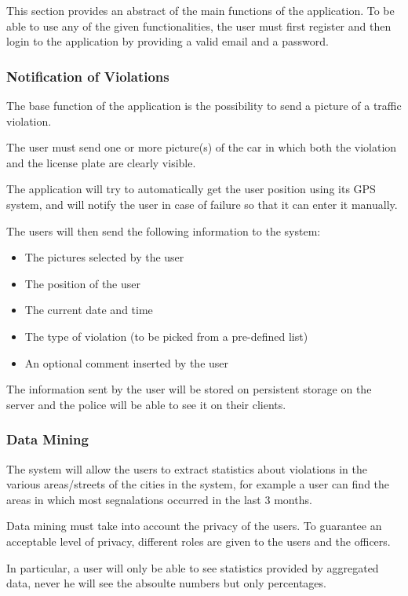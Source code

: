 This section provides an abstract of the main functions of the application. To be able to use any of the given functionalities, the user must first register and then login to the application by providing a valid email and a password.
\subsubsection{Notification of Violations}
\label{sec:notification_of_violations}
The base function of the application is the possibility to send a picture of a traffic violation.

The user must send one or more picture(s) of the car in which both the violation and the license plate are clearly visible.

The application will try to automatically get the user position using its GPS system, and will notify the user in case of failure so that it can enter it manually.

The users will then send the following information to the system:
\begin{itemize}
    \item The pictures selected by the user
    \item The position of the user
    \item The current date and time
    \item The type of violation (to be picked from a pre-defined list)
    \item An optional comment inserted by the user
\end{itemize}
The information sent by the user will be stored on persistent storage on the server and the police will be able to see it on their clients.

\subsubsection{Data Mining}
\label{sec:data_mining}
The system will allow the users to extract statistics about violations in the various areas/streets of the cities in the system,
for example a user can find the areas in which most segnalations occurred in the last 3 months.

Data mining must take into account the privacy of the users.
To guarantee an acceptable level of privacy, different roles are given to the users and the officers.

In particular, a user will only be able to see statistics provided by aggregated data, never he will see the absoulte numbers but only percentages. 

